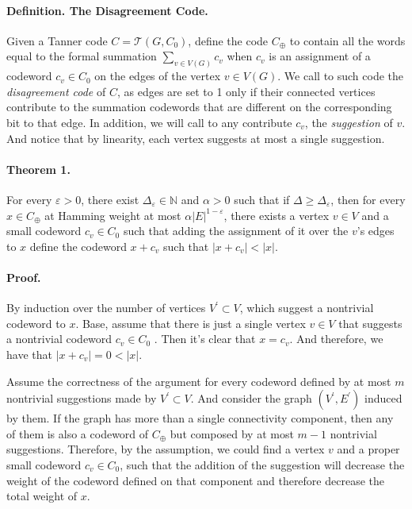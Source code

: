 \documentclass{article}
\newcommand{ \Tann } {  \mathcal{T}\left( G, C_0 \right) }
\begin{document}
\begin{multicols*}{2}
\paragraph{Definition. The Disagreement Code.} Given a Tanner code $C = \Tann$, define the code $C_{\oplus}$ to contain all the words equal to the formal summation $ \sum_{v \in V\left( G \right)} {c_{v} }$ when $c_{v}$ is an assignment of a codeword $ c_{v} \in C_0 $  on the edges of the vertex $ v \in V\left( G \right)$.
We call to such code the \textit{disagreement code} of $C$, as edges are set to 1 only if their connected vertices contribute to the summation codewords that are different on the corresponding bit to that edge. In addition, we will call to any contribute $c_v$, the \textit{suggestion} of $v$. And notice that by linearity, each vertex suggests at most a single suggestion.   
 
\paragraph{Theorem 1.} For every $\varepsilon > 0$, there exist $\Delta_{\varepsilon}\in \mathbb{N}$ and $\alpha>0$ such that if $\Delta \ge \Delta_{\varepsilon}$, then for every $x \in C_{\oplus}$ at Hamming weight at most $\alpha |E|^{1-\varepsilon}$, there exists a vertex $v \in V$ and a small codeword $c_{v} \in C_{0} $ such that adding the assignment of it over the $v$'s edges to $x$ define the codeword $x + c_{v}$  such that $|x + c_{v}| < |x|$.  

\paragraph{Proof.} By induction over the number of vertices $V^\prime \subset V$, which suggest a nontrivial codeword to $x$. Base, assume that there is just a single vertex $v \in V$ that suggests a nontrivial codeword $c_{v} \in C_{0}$ . Then it's clear that $x = c_{v}$. And therefore, we have that $|x +c_{v}| = 0 < |x|$.

Assume the correctness of the argument for every codeword defined by at most $m$ nontrivial suggestions made by $V^\prime \subset V$.  And consider the graph $\left( V^\prime, E^\prime \right)$ induced by them. If the graph has more than a single connectivity component, then any of them is also a codeword of $C_{\oplus}$  but composed by at most $m-1$ nontrivial suggestions. Therefore, by the assumption, we could find a vertex $v$ and a proper small codeword $c_v \in C_0 $, such that the addition of the suggestion will decrease the weight of the codeword defined on that component and therefore decrease the total weight of $x$.


\end{multicols*}
\end{document}
